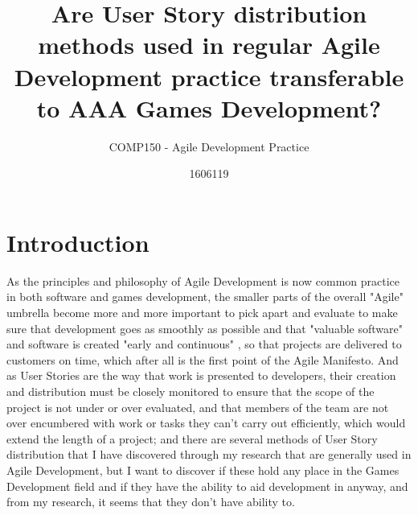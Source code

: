 \documentclass{scrartcl}
\title{Are User Story distribution methods used in regular Agile Development practice transferable to AAA Games Development?}
\subtitle{COMP150 - Agile Development Practice}
\author{1606119}
\begin{document}
\maketitle


\section{Introduction}

As the principles and philosophy of Agile Development is now common practice in both software and games development, the smaller parts of the overall "Agile" umbrella become more and more important to pick apart and evaluate to make sure that development goes as smoothly as possible and that "valuable software" and software is created "early and continuous" \cite{agilemanifesto}, so that projects are delivered to customers on time, which after all is the first point of the Agile Manifesto. And as User Stories are the way that work is presented to developers, their creation and distribution must be closely monitored to ensure that the scope of the project is not under or over evaluated, and that members of the team are not over encumbered with work or tasks they can't carry out efficiently, which would extend the length of a project; and there are several methods of User Story distribution that I have discovered through my research that are generally used in Agile Development, but I want to discover if these hold any place in the Games Development field and if they have the ability to aid development in anyway, and from my research, it seems that they don't have ability to.
\end{document}
